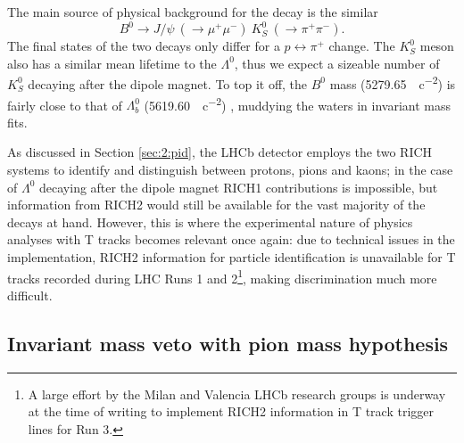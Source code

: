 The main source of physical background for the \demonstratorfull decay is the similar
\begin{equation}
	B^0 \rightarrow J/\psi~(\rightarrow \mu^+ \mu^-)~K_S^0~(\rightarrow \pi^+ \pi^-).
\end{equation}
The final states of the two decays only differ for a $p \leftrightarrow \pi^+$ change.
The $K_S^0$ meson also has a similar mean lifetime to the $\Lambda^0$, thus we expect a sizeable number of $K_S^0$ decaying after the dipole magnet.
To top it off, the $B^0$ mass (\SI{5279.65}{\mev\per c\squared}) is fairly close to that of $\Lambda_b^0$ (\SI{5619.60}{\mev\per c\squared}) \cite{PDG}, muddying the waters in invariant mass fits.

As discussed in Section \ref{sec:2:pid}, the LHCb detector employs the two RICH systems to identify and distinguish between protons, pions and kaons;
in the case of $\Lambda^0$ decaying after the dipole magnet RICH1 contributions is impossible, but information from RICH2 would still be available for the vast majority of the decays at hand.
However, this is where the experimental nature of physics analyses with T tracks becomes relevant once again:
due to technical issues in the implementation, RICH2 information for particle identification is unavailable for T tracks recorded during LHC Runs 1 and 2\footnote{A large effort by the Milan and Valencia LHCb research groups is underway at the time of writing to implement RICH2 information in T track trigger lines for Run 3.}, making \physbkgshort discrimination much more difficult.

\subsection{Invariant mass veto with pion mass hypothesis}
\label{sec:B0_veto}

